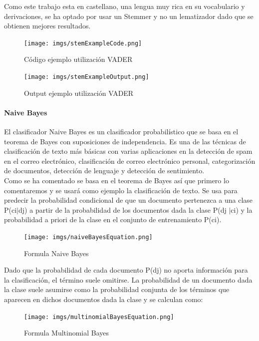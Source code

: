 \documentclass[../all.tex]{subfiles}
\begin{document}
        	Como este trabajo esta en castellano, una lengua muy rica en su vocabulario y derivaciones, se ha optado por usar un Stemmer y no un lematizador dado que se obtienen mejores resultados.\\
        	
        	\begin{figure}[H]
        		\centering
        		\texttt{[image: imgs/stemExampleCode.png]}
        		\caption{Código ejemplo utilización VADER}
        	\end{figure}
        	\begin{figure}[H]
        		\centering
        		\texttt{[image: imgs/stemExampleOutput.png]}
        		\caption{Output ejemplo utilización VADER}
        	\end{figure}
        	
        	

        \paragraph{Naive Bayes}
        
        	El clasificador Naive Bayes es un clasificador probabilístico que se basa en el teorema de Bayes con suposiciones de independencia. Es una de las técnicas de clasificación de texto más básicas con varias aplicaciones en la detección de spam en el correo electrónico, clasificación de correo electrónico personal, categorización de documentos, detección de lenguaje y detección de sentimiento. \\
        	
        	Como se ha comentado se basa en el teorema de Bayes así que primero lo comentaremos y se usará como ejemplo la clasificación de texto. Se usa para predecir la probabilidad condicional de que un documento pertenezca a una clase P(c{\tiny i}$|$d{\tiny j}) a partir de la probabilidad de los documentos dada la clase P(d{\tiny j} $|$c{\tiny i}) y la probabilidad a priori de la clase en el conjunto de entrenamiento P(c{\tiny i})\cite{naiveBayes}.
        	
        	\begin{figure}[H]
        		\centering
        		\texttt{[image: imgs/naiveBayesEquation.png]}
        		\caption{Formula Naive Bayes}
        	\end{figure}
        	
        	Dado que la probabilidad de cada documento P(d{\tiny j}) no aporta información
        	para la clasificación, el término suele omitirse. La probabilidad de un documento
        	dada la clase suele asumirse como la probabilidad conjunta de los términos que
        	aparecen en dichos documentos dada la clase y se calculan como:
        	\begin{figure}[H]
        		\centering
        		\texttt{[image: imgs/multinomialBayesEquation.png]}
        		\caption{Formula Multinomial Bayes}
        	\end{figure}
        
\end{document}
